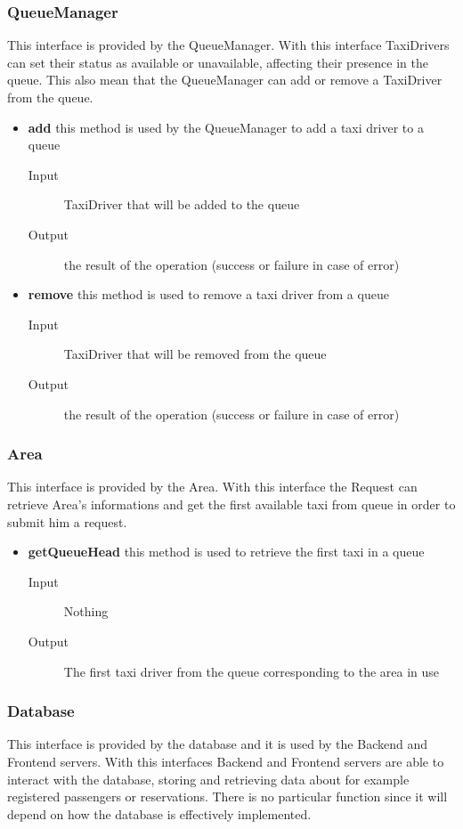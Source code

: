 		\subsubsection{QueueManager} 
		This interface is provided by the QueueManager. With this interface TaxiDrivers can set their status as available or unavailable, affecting their presence in the queue. This also mean that the QueueManager can add or remove a TaxiDriver from the queue.
		\begin{itemize}
			\item \textbf{add} this method is used by the QueueManager to add a taxi driver to a queue
			\begin{description}
				\item[Input] TaxiDriver that will be added to the queue
				\item[Output] the result of the operation (success or failure in case of error)
			\end{description}
			\item \textbf{remove} this method is used to remove a taxi driver from a queue
			\begin{description}
				\item[Input] TaxiDriver that will be removed from the queue
				\item[Output] the result of the operation (success or failure in case of error)
			\end{description}
		\end{itemize}
		\subsubsection{Area} 
		This interface is provided by the Area. With this interface the Request can retrieve Area's informations and get the first available taxi from queue in order to submit him a request.
		\begin{itemize}
			\item \textbf{getQueueHead} this method is used to retrieve the first taxi in a queue
			\begin{description}
				\item[Input] Nothing
				\item[Output] The first taxi driver from the queue corresponding to the area in use
			\end{description}
		\end{itemize}
		\subsubsection{Database} 
		This interface is provided by the database and it is used by the Backend and Frontend servers. With this interfaces Backend and Frontend servers are able to interact with the database, storing and retrieving data about for example registered passengers or reservations. There is no particular function since it will depend on how the database is effectively implemented.
	\newpage
